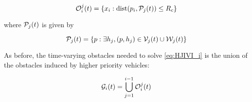 \begin{equation}
\mathcal{O}_i^j(t) = \{x_i: \text{dist}(p_i, \mathcal{P}_j(t)) \le R_c \}
\end{equation}

\noindent where $\mathcal{P}_j(t)$ is given by

\begin{equation}
\mathcal{P}_j(t) = \{p: \exists h_j, (p, h_j) \in \mathcal{V}_j(t) \cup \mathcal{W}_j(t)\}
\end{equation}

As before, the time-varying obstacles needed to solve \eqref{eq:HJIVI_i} is the union of the obstacles induced by higher priority vehicles:

\begin{equation}
\mathcal{G}_i(t) = \bigcup_{j=1}^{i-1}\mathcal{O}_i^j(t)
\end{equation}